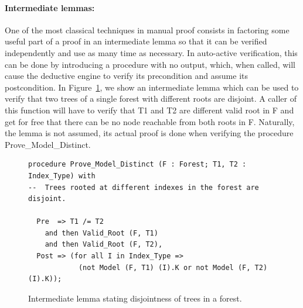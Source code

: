 \documentclass[11pt,a4paper]{article}
\begin{document}
\paragraph{Intermediate lemmas:}
One of the most classical techniques in manual proof consists in factoring some useful
part of a proof in an intermediate lemma so that it can be verified independently and
use as many time as necessary. In auto-active verification, this can be done by introducing
a procedure with no output, which, when called, will cause the deductive engine to verify
its precondition and assume its postcondition. In Figure~\ref{fig-proof-lem}, we show an
intermediate lemma which can be used to verify that two trees of a single forest with different
roots are disjoint. A caller of this function will have to verify that T1 and T2 are different
valid root in F and get for free that there can be no node reachable from both roots in F.
Naturally, the lemma is not assumed, its actual proof is done when verifying the procedure
Prove\_Model\_Distinct.

\begin{figure}
\begin{small}
\begin{lstlisting}
procedure Prove_Model_Distinct (F : Forest; T1, T2 : Index_Type) with
--  Trees rooted at different indexes in the forest are disjoint.

  Pre  => T1 /= T2
    and then Valid_Root (F, T1)
    and then Valid_Root (F, T2),
  Post => (for all I in Index_Type =>
            (not Model (F, T1) (I).K or not Model (F, T2) (I).K));
\end{lstlisting}
\end{small}
\caption{\label{fig-proof-lem} Intermediate lemma stating disjointness of trees in a forest.}
\end{figure}
\end{document}
